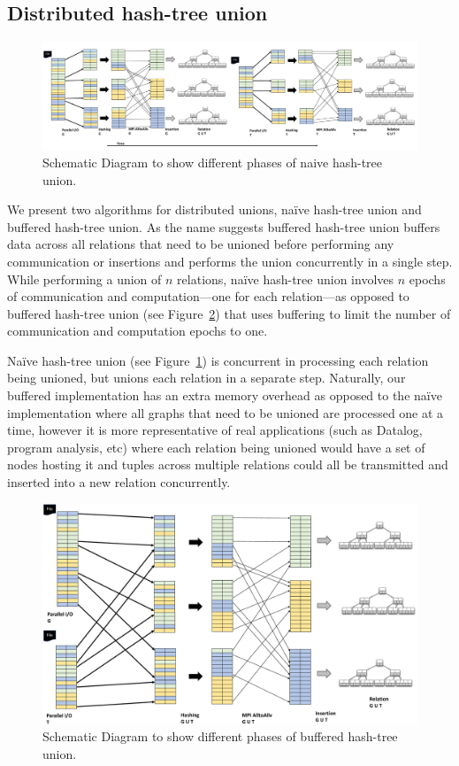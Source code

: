 \subsection{Distributed hash-tree union}

\begin{figure}[h]
	\includegraphics[width=\textwidth]{results/union_1.pdf}
	\caption{Schematic Diagram to show different phases of naive hash-tree union.}
	\label{fig:union_1}
\end{figure}

We present two algorithms for distributed unions, na\"ive hash-tree union and buffered hash-tree union. As the name suggests buffered hash-tree union buffers data across all relations that need to be unioned before performing any communication or insertions and performs the union concurrently in a single step. While performing a union of $n$ relations, na\"ive hash-tree union involves $n$ epochs of communication and computation---one for each relation---as opposed to buffered hash-tree union (see Figure~\ref{fig:union_2}) that uses buffering to limit the number of communication and computation epochs to one.

Na\"ive hash-tree union (see Figure~\ref{fig:union_1}) is concurrent in processing each relation being unioned, but unions each relation in a separate step. Naturally, our buffered implementation has an extra memory overhead as opposed to the na\"ive implementation where all graphs that need to be unioned are processed one at a time, however it is more representative of real applications (such as Datalog, program analysis, etc) where each relation being unioned would have a set of nodes hosting it and tuples across multiple relations could all be transmitted and inserted into a new relation concurrently.

\begin{figure}[h]
	\includegraphics[width=\columnwidth]{results/union_2.pdf}
	\caption{Schematic Diagram to show different phases of buffered hash-tree union.}
	\label{fig:union_2}
\end{figure}

